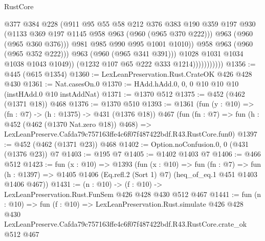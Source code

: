 \begin{lexlean}{RustCore}
\begin{coremodule}
                                    @377
                                    @384
                                    @228
                                    (@911
                                      @95
                                      @55
                                      @58
                                      @212
                                      @376
                                      @383
                                      @190
                                      @359
                                      @197
                                      @930
                                      (@1133 @369 @197 @1145 @958 @963 (@960 (@965 @370 @222)))
                                      @963
                                      (@960 (@965 @360 @376)))
                                    @981
                                    @985
                                    @990
                                    @995
                                    @1001
                                    @1010))
                                @958
                                @963
                                (@960 (@965 @352 @222)))
                              @963
                              (@960 (@965 @341 @391)))
                            @1028
                            @1031
                            @1034
                            @1038
                            @1043
                            @1049))
                        (@1232 @107 @65 @222 @333 @1214)))))))))))
@1356 := @445 (@615 @1354)
@1360 := LexLeanPreservation.Rust.CrateOK @426 @428 @430
@1361 := Nat.casesOn.{0}
@1370 := HAdd.hAdd.{0, 0, 0} @10 @10 @10 (instHAdd.{0} @10 instAddNat)
@1371 := @1370 @512
@1375 := @452 (@462 (@1371 @18)) @468
@1376 := @1370 @510
@1393 := @1361
    (fun (y : @10) => (fn : @7) -> (h : @1375) -> @431 (@1376 @18))
    @467
    (fun (fn : @7) =>
    fun (h : @452 (@462 (@1370 Nat.zero @18)) @468) =>
    LexLeanPreserve.Cafda79c757163ffe4c6f07f487422bdf.R43.RustCore.fun0)
@1397 := @452 (@462 (@1371 @23)) @468
@1402 := Option.noConfusion.{0, 0} (@431 (@1376 @23)) @7
@1403 := @195 @7
@1405 := @1402 @1403 @7
@1406 := @466 @512
@1423 := fun (x : @10) =>
  @1393
    (fun (x : @10) =>
    fun (fn : @7) =>
    fun (h : @1397) => @1405 @1406 (Eq.refl.{2} (Sort 1) @7) (heq_of_eq.{1} @451 @1403 @1406 @467))
@1431 := (n : @10) -> (f : @10) -> LexLeanPreservation.Rust.FunSem @426 @428 @430 @512 @467
@1441 := fun (n : @10) =>
  fun (f : @10) =>
  LexLeanPreservation.Rust.simulate
    @426
    @428
    @430
    LexLeanPreserve.Cafda79c757163ffe4c6f07f487422bdf.R43.RustCore.crate_ok
    @512
    @467
\end{coremodule}
\end{lexlean}
